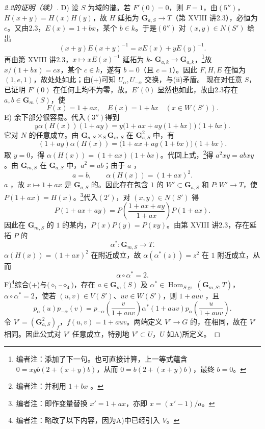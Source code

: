 \begin{proof}[2.2的证明（续）]
D) 设 $S$ 为域的谱。若 $F'(0)=0$，则 $F=1$，由$(5'')$，$H(x+y)=H(x)H(y)$，故 $H$ 延拓为 $\mathbf G_{a,S}\to T$（第 XVIII 讲2.3），必恒为 $e$。又由2.3，$E(x)=1+bx$，某个 $b\in k$。于是$(6'')$ 对 $(x,y)\in N(S')$ 给出
\[(x+y)E(x+y)^{-1}=xE(x)+yE(y)^{-1}.\]
再由第 XVIII 讲2.3，$x\mapsto xE(x)^{-1}$ 延拓为 $k$- $\mathbf G_{a,k}\to\mathbf G_{a,k}$，\footnote{编者注：添加了下一句。也可直接计算，上一等式蕴含 $0=xyb(2+(x+y)b)$，从而 $0=b(2+(x+y)b)$，最终 $b=0$。}故 $x/(1+bx)=cx$，某个 $c\in k$，遂有 $b=0$（且 $c=1$）。因此 $F,H,E$ 在恒为 $(1,e,1)$，故处处如此；由(+)可知 $U_\alpha,U_{-\alpha}$ 交换，与(ii)矛盾。
现在对任意 $S$，已证明 $F'(0)$ 在任何上均不为零，故。$E'(0)$ 显然也如此，故由2.3存在 $a,b\in\mathbf G_m(S)$，使
\[F(x)=1+ax,\quad E(x)=1+bx\quad(x\in W(S')).\tag{$\diamond_1$}\]
E) 余下部分很容易。代入$(3'')$得到
\[y\alpha(H(x))(1+ay)=y\bigl(1+ax+ay(1+bx)\bigr)(1+bx).\]
它对 $N$ 的任意成立。由 $\mathbf G_{a,S}\times_S\mathbf G_{m,S}$ 在 $\mathbf G_{a,S}^2$ 中，有
\[(1+ay)\alpha(H(x))=\bigl(1+ax+ay(1+bx)\bigr)(1+bx).\]
取 $y=0$，得 $\alpha(H(x))=(1+ax)(1+bx)$。代回上式，\footnote{编者注：并利用 $1+bx$ 。}得 $a^2xy=abxy$。由 $\mathbf G_{m,S}$ 在 $\mathbf G_{a,S}$ 中，$a^2=ab$；由于 $a$ ，
\[a=b,\qquad\alpha(H(x))=(1+ax)^2.\tag{$\diamond_2$}\]
$a$ ，故 $x\mapsto1+ax$ 是 $\mathbf G_{a,S}$ 的。因此存在包含 $1$ 的 $W'\subset\mathbf G_{a,S}$ 和 $P:W'\to T$，使 $P(1+ax)=H(x)$。\footnote{编者注：即作变量替换 $x'=1+ax$，亦即 $x=(x'-1)/a$。}代入$(2')$，对 $(x,y)\in N(S')$ 得
\[P(1+ax+ay)=P\left(\frac{1+ax+ay}{1+ax}\right)P(1+ax).\]
因此在 $\mathbf G_{m,S}$ 的 $1$ 的某内，$P(x)P(y)=P(xy)$。由第 XVIII 讲2.3，存在延拓 $P$ 的
\[\alpha^*:\mathbf G_{m,S}\longrightarrow T.\tag{$\diamond_3$}\]
$\alpha(H(x))=(1+ax)^2$ 在附近成立，故 $\alpha(\alpha^*(z))=z^2$ 在 $1$ 附近成立，从而
\[\alpha\circ\alpha^*=2.\tag{$\diamond_4$}\]
F)\footnote{编者注：略改了以下内容，因为A)中已经引入 $V$。}综合(+)与$(\diamond_1$--$\diamond_4)$，存在 $a\in\mathbf G_m(S)$ 及 $\alpha^*\in\operatorname{Hom}_{S\text{-gr.}}(\mathbf G_{m,S},T)$，$\alpha\circ\alpha^*=2$，使若 $(u,v)\in V(S')$、$uv\in W(S')$，则 $1+auv$ ，且
\[p_\alpha(u)p_{-\alpha}(v)=p_{-\alpha}\left(\frac v{1+auv}\right)\alpha^*(1+auv)p_\alpha\left(\frac u{1+auv}\right).\]
令 $V'=(\mathbf G_{a,S}^2)_f$，$f(u,v)=1+auv$。两端定义 $V'\to G$ 的，在相同，故在 $V'$ 相同。因此公式对 $V'$ 任意成立，特别地 $V'\subset U$，$U$ 如A)所定义。


\end{proof}
